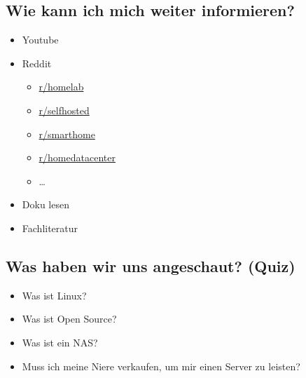 \documentclass[
    ngerman,
    accentcolor=3b,
    fontsize= 12pt,
    a4paper,
    aspectratio=169,
    colorback=true,
    fancy_row_colors,
    leqno,
    fleqn,
    boxarc=3pt,
    fleqn,
    main,
    design=2008,
]{algoslides}
\begin{document}
    \subsection{Wie kann ich mich weiter informieren?}
    \begin{frame}
        \slidehead{}
        \begin{itemize}
            \item Youtube
            \item Reddit
                \begin{itemize}
                    \item \href{https://www.reddit.com/r/homelab/}{r/homelab}
                    \item \href{https://www.reddit.com/r/selfhosted/}{r/selfhosted}
                    \item \href{https://www.reddit.com/r/opensource/}{r/smarthome}
                    \item \href{https://www.reddit.com/r/homelab/}{r/homedatacenter}
                    \item \dots
                \end{itemize}
            \item Doku lesen
            \item Fachliteratur
        \end{itemize}
    \end{frame}

    \subsection{Was haben wir uns angeschaut? (Quiz)}
    \begin{frame}
        \slidehead{}
        \begin{itemize}
            \item Was ist Linux?
            \item Was ist Open Source?
            \item Was ist ein NAS?
            \item Muss ich meine Niere verkaufen, um mir einen Server zu leisten?
        \end{itemize}
    \end{frame}
\end{document}
